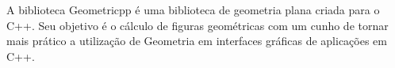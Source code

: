 A biblioteca {\ttfamily Geometricpp} é uma biblioteca de geometria plana criada para o {\ttfamily C++}. Seu objetivo é o cálculo de figuras geométricas com um cunho de tornar mais prático a utilização de Geometria em interfaces gráficas de aplicações em {\ttfamily C++}. 